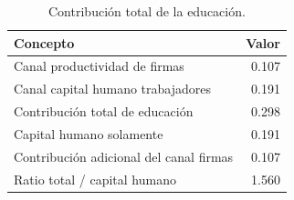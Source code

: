 \begin{table}[H]
    \centering
    \begin{tabular}{lr}
        \toprule
        Concepto & Valor \\
        \midrule
        Canal productividad de firmas & 0.107 \\
        Canal capital humano trabajadores & 0.191 \\
        Contribución total de educación & 0.298 \\
        Capital humano solamente & 0.191 \\
        Contribución adicional del canal firmas & 0.107 \\
        Ratio total / capital humano & 1.560 \\
        \bottomrule
    \end{tabular}

    \caption{Contribuci\'on total de la educaci\'on.}
    \label{tab:p6_p4_education_contribution}
\end{table}
